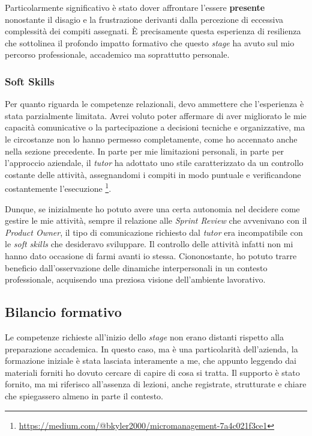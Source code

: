     \vspace{0.2 em}
    \noindent Particolarmente significativo è stato dover affrontare l'essere \textbf{presente} nonostante il disagio e la frustrazione derivanti dalla percezione di eccessiva complessità dei compiti assegnati. È precisamente questa esperienza di resilienza che sottolinea il profondo impatto formativo che questo \textit{stage} ha avuto sul mio percorso professionale, accademico ma soprattutto personale. 

    \subsubsection{Soft Skills}
    Per quanto riguarda le competenze relazionali, devo ammettere che l'esperienza è stata parzialmente limitata. Avrei voluto poter affermare di aver migliorato le mie capacità comunicative o la partecipazione a decisioni tecniche e organizzative, ma le circostanze non lo hanno permesso completamente, come ho accennato anche nella sezione precedente. In parte per mie limitazioni personali, in parte per l'approccio aziendale, il \textit{tutor} ha adottato uno stile caratterizzato da un controllo costante delle attività, assegnandomi i compiti in modo puntuale e verificandone costantemente l'esecuzione \footnote{\href{https://medium.com/@bkyler2000/micromanagement-7a4c021f3ce1}{https://medium.com/@bkyler2000/micromanagement-7a4c021f3ce1}}. 

    \vspace{0.2 em}
    \noindent Dunque, se inizialmente ho potuto avere una certa autonomia nel decidere come gestire le mie attività, sempre il relazione alle \textit{Sprint Review} che avvenivano con il \textit{Product Owner}, il tipo di comunicazione richiesto dal \textit{tutor} era incompatibile con le \textit{soft skills} che desideravo sviluppare. Il controllo delle attività infatti non mi hanno dato occasione di farmi avanti io stessa. Ciononostante, ho potuto trarre beneficio dall'osservazione delle dinamiche interpersonali in un contesto professionale, acquisendo una preziosa visione dell'ambiente lavorativo.
     
    \subsection{Bilancio formativo}
    Le competenze richieste all'inizio dello \textit{stage} non erano distanti rispetto alla preparazione accademica. In questo caso, ma è una particolarità dell'azienda, la formazione iniziale è stata lasciata interamente a me, che appunto leggendo dai materiali forniti ho dovuto cercare di capire di cosa si tratta. Il supporto è stato fornito, ma mi riferisco all'assenza di lezioni, anche registrate, strutturate e chiare che spiegassero almeno in parte il contesto.

